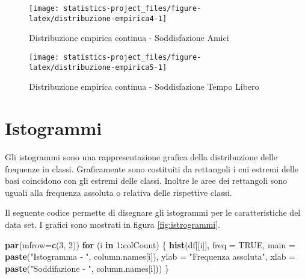\documentclass[]{book}
\newenvironment{Shaded}{\begin{snugshade}}{\end{snugshade}}
\newcommand{\KeywordTok}[1]{\textcolor[rgb]{0.13,0.29,0.53}{\textbf{#1}}}
\newcommand{\DataTypeTok}[1]{\textcolor[rgb]{0.13,0.29,0.53}{#1}}
\newcommand{\DecValTok}[1]{\textcolor[rgb]{0.00,0.00,0.81}{#1}}
\newcommand{\StringTok}[1]{\textcolor[rgb]{0.31,0.60,0.02}{#1}}
\newcommand{\OtherTok}[1]{\textcolor[rgb]{0.56,0.35,0.01}{#1}}
\newcommand{\ControlFlowTok}[1]{\textcolor[rgb]{0.13,0.29,0.53}{\textbf{#1}}}
\newcommand{\OperatorTok}[1]{\textcolor[rgb]{0.81,0.36,0.00}{\textbf{#1}}}
\newcommand{\NormalTok}[1]{#1}
\begin{document}
\begin{figure}

{\centering \texttt{[image: statistics-project\_files/figure-latex/distribuzione-empirica4-1]} 

}

\caption{Distribuzione empirica continua - Soddisfazione Amici}\label{fig:distribuzione-empirica4}
\end{figure}

\begin{figure}

{\centering \texttt{[image: statistics-project\_files/figure-latex/distribuzione-empirica5-1]} 

}

\caption{Distribuzione empirica continua - Soddisfazione Tempo Libero}\label{fig:distribuzione-empirica5}
\end{figure}

\section{Istogrammi}\label{istogrammi}

Gli istogrammi sono una rappresentazione grafica della distribuzione
delle frequenze in classi. Graficamente sono costituiti da rettangoli i
cui estremi delle basi coincidono con gli estremi delle classi. Inoltre
le aree dei rettangoli sono uguali alla frequenza assoluta o relativa
delle rispettive classi.

Il seguente codice permette di disegnare gli istogrammi per le
caratteristiche del data set. I grafici sono mostrati in figura
\ref{fig:istrogrammi}.

\begin{Shaded}
\begin{Highlighting}[]
\KeywordTok{par}\NormalTok{(}\DataTypeTok{mfrow=}\KeywordTok{c}\NormalTok{(}\DecValTok{3}\NormalTok{, }\DecValTok{2}\NormalTok{))}
\ControlFlowTok{for}\NormalTok{ (i }\ControlFlowTok{in} \DecValTok{1}\OperatorTok{:}\NormalTok{colCount) \{}
  \KeywordTok{hist}\NormalTok{(df[[i]], }\DataTypeTok{freq =} \OtherTok{TRUE}\NormalTok{,}
     \DataTypeTok{main =} \KeywordTok{paste}\NormalTok{(}\StringTok{"Istogramma - "}\NormalTok{, column.names[i]), }
     \DataTypeTok{ylab =} \StringTok{"Frequenza assoluta"}\NormalTok{, }
     \DataTypeTok{xlab =} \KeywordTok{paste}\NormalTok{(}\StringTok{"Soddifazione - "}\NormalTok{, column.names[i]))}
\NormalTok{\}}
\end{Highlighting}
\end{Shaded}
\end{document}
